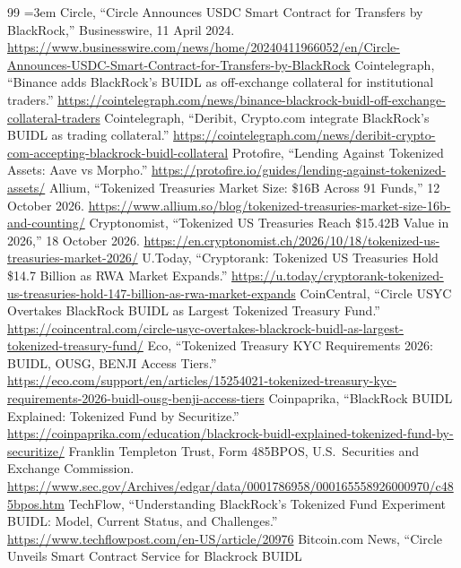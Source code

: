 \documentclass[11pt,a4paper]{article}
\begin{document}
\begin{thebibliography}{99}
\footnotesize\sloppy\emergencystretch=3em
 Circle, ``Circle Announces USDC Smart Contract for Transfers by BlackRock,''
Businesswire, 11 April 2024. \url{https://www.businesswire.com/news/home/20240411966052/en/Circle-Announces-USDC-Smart-Contract-for-Transfers-by-BlackRock}
 Cointelegraph, ``Binance adds BlackRock's BUIDL as off-exchange collateral for
institutional traders.'' \url{https://cointelegraph.com/news/binance-blackrock-buidl-off-exchange-collateral-traders}
 Cointelegraph, ``Deribit, Crypto.com integrate BlackRock's BUIDL as trading
collateral.'' \url{https://cointelegraph.com/news/deribit-crypto-com-accepting-blackrock-buidl-collateral}
 Protofire, ``Lending Against Tokenized Assets: Aave vs Morpho.''
\url{https://protofire.io/guides/lending-against-tokenized-assets/}
 Allium, ``Tokenized Treasuries Market Size: \$16B Across 91 Funds,'' 12 October 2026.
\url{https://www.allium.so/blog/tokenized-treasuries-market-size-16b-and-counting/}
 Cryptonomist, ``Tokenized US Treasuries Reach \$15.42B Value in 2026,''
18 October 2026. \url{https://en.cryptonomist.ch/2026/10/18/tokenized-us-treasuries-market-2026/}
 U.Today, ``Cryptorank: Tokenized US Treasuries Hold \$14.7 Billion as RWA Market
Expands.'' \url{https://u.today/cryptorank-tokenized-us-treasuries-hold-147-billion-as-rwa-market-expands}
 CoinCentral, ``Circle USYC Overtakes BlackRock BUIDL as Largest Tokenized
Treasury Fund.'' \url{https://coincentral.com/circle-usyc-overtakes-blackrock-buidl-as-largest-tokenized-treasury-fund/}
 Eco, ``Tokenized Treasury KYC Requirements 2026: BUIDL, OUSG, BENJI Access Tiers.''
\url{https://eco.com/support/en/articles/15254021-tokenized-treasury-kyc-requirements-2026-buidl-ousg-benji-access-tiers}
 Coinpaprika, ``BlackRock BUIDL Explained: Tokenized Fund by Securitize.''
\url{https://coinpaprika.com/education/blackrock-buidl-explained-tokenized-fund-by-securitize/}
 Franklin Templeton Trust, Form 485BPOS, U.S.\ Securities and Exchange Commission.
\url{https://www.sec.gov/Archives/edgar/data/0001786958/000165558926000970/c485bpos.htm}
 TechFlow, ``Understanding BlackRock's Tokenized Fund Experiment BUIDL: Model,
Current Status, and Challenges.'' \url{https://www.techflowpost.com/en-US/article/20976}
 Bitcoin.com News, ``Circle Unveils Smart Contract Service for Blackrock BUIDL

\end{thebibliography}
\end{document}
